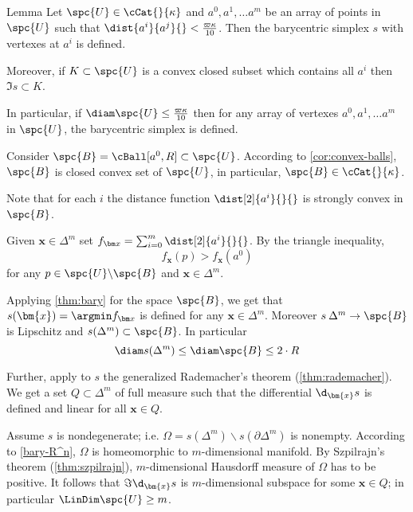 \begin{thm}{Lemma}\label{lem:bary-cat}
Let $\spc{U}\in\cCat{}{\kappa}$
and $a^0,a^1,\dots a^m$ be an array of points in $\spc{U}$ such that
$\dist{a^i}{a^j}{}< \tfrac{\varpi\kappa}{10}$. 
Then the barycentric simplex $s$ with vertexes at $a^i$ is defined.

Moreover, if $K\subset \spc{U}$ is a convex closed subset which contains all $a^i$
then $\Im s\subset K$.

In particular, if $\diam \spc{U}\le \tfrac{\varpi\kappa}{10}$
then for any array of vertexes $a^0,a^1,\dots a^m$ in $\spc{U}$,
the barycentric simplex is defined.
\end{thm}

Consider $\spc{B}=\cBall[a^0,R]\subset\spc{U}$.
According to \ref{cor:convex-balls}, $\spc{B}$ is closed convex set of $\spc{U}$,
in particular, $\spc{B}\in\cCat{}{\kappa}$.

Note that for each $i$ the distance function $\dist[2]{a^i}{}{}$ is strongly convex in $\spc{B}$.

Given $\bm{x}\in\Delta^m$ set $f_{\bm x}=\sum_{i=0}^m \dist[2]{a^i}{}{}$.
By the triangle inequality, 
$$f_{\bm x}(p)> f_{\bm x}(a^0)$$
for any $p\in\spc{U}\backslash\spc{B}$
and $\bm{x}\in\Delta^m$.

Applying \ref{thm:bary} for the space $\spc{B}$, we get that
$s(\bm{x})=\argmin f_{\bm x}$
is defined for any $\bm{x}\in\Delta^m$.
Moreover $s\:\Delta^m\to\spc{B}$ is Lipschitz
 and $s(\Delta^m)\subset \spc{B}$.
In particular 
$$\diam s(\Delta^m)
\le
\diam \spc{B}
\le
2\cdot R$$ 

Further, apply to $s$ the generalized Rademacher's theorem (\ref{thm:rademacher}).
We get a set $Q\subset\Delta^m$ of full measure such that
the differential $\d_{\bm{x}}s$ is defined and linear for all $\bm{x}\in Q$.

Assume $s$ is nondegenerate; 
i.e. $\Omega=s(\Delta^m)\backslash s(\partial\Delta^m)$ is nonempty.
According to \ref{bary-R^n}, $\Omega$ is homeomorphic to $m$-dimensional manifold.
By Szpilrajn's theorem (\ref{thm:szpilrajn}), $m$-dimensional Hausdorff measure of $\Omega$ has to be positive.
It follows %
that  $\Im\d_{\bm{x}}s$ is $m$-dimensional subspace for some $\bm{x}\in Q$;
in particular $\LinDim \spc{U}\ge m$.
\qeds















